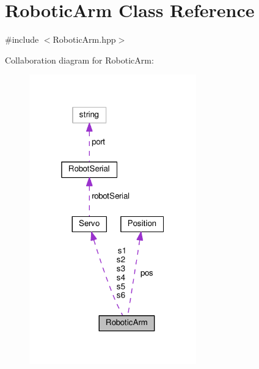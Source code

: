 \hypertarget{class_robotic_arm}{}\section{Robotic\+Arm Class Reference}
\label{class_robotic_arm}


{\ttfamily \#include $<$Robotic\+Arm.\+hpp$>$}



Collaboration diagram for Robotic\+Arm\+:\nopagebreak
\begin{figure}[H]
\begin{center}
\leavevmode
\includegraphics[width=205pt]{class_robotic_arm__coll__graph}
\end{center}
\end{figure}
